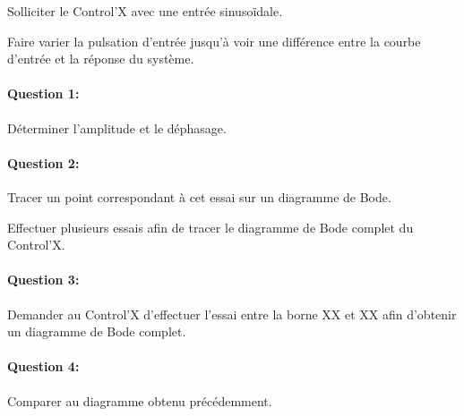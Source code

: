

\ifdef{\public}{\cleardoublepage}{}



Solliciter le Control'X avec une entrée sinusoïdale.

Faire varier la pulsation d'entrée jusqu'à voir une différence entre la courbe d'entrée et la réponse du système.


\paragraph{Question 1:} Déterminer l'amplitude et le déphasage.

\paragraph{Question 2:} Tracer un point correspondant à cet essai sur un diagramme de Bode.

Effectuer plusieurs essais afin de tracer le diagramme de Bode complet du Control'X.

\paragraph{Question 3:} Demander au Control'X d'effectuer l'essai entre la borne XX et XX afin d'obtenir un diagramme de Bode complet.

\paragraph{Question 4:} Comparer au diagramme obtenu précédemment.



